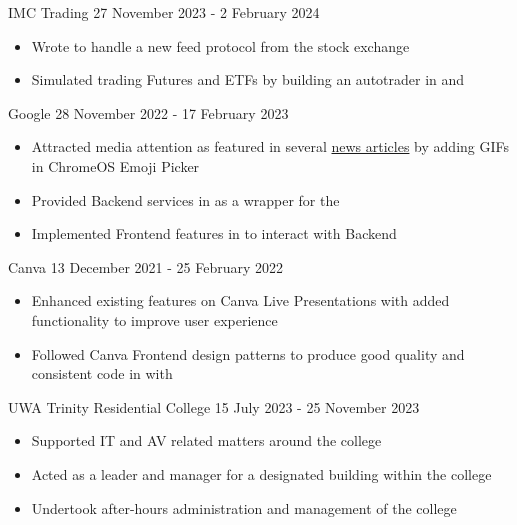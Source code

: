 \documentclass[paper=a4,fontsize=9pt]{resume}
\begin{document}
{	\divider

		{IMC Trading}
		{27 November 2023 - 2 February 2024}
	\begin{itemize}
		\item Wrote  to handle a new feed protocol from the stock exchange
		\item Simulated trading Futures and ETFs by building an autotrader in  and 
	\end{itemize}

	\divider

		{Google}
		{28 November 2022 - 17 February 2023}
	\begin{itemize}
		\item Attracted media attention as featured in several \href{https://chromeunboxed.com/gif-support-chromebook-chrome-os-emoji-picker/}{news articles} by adding GIFs in ChromeOS Emoji Picker
		\item Provided Backend services in  as a wrapper for the 
		\item Implemented Frontend features in  to interact with Backend
	\end{itemize}

	\divider

		{Canva}
		{13 December 2021 - 25 February 2022}
	\begin{itemize}
		\item Enhanced existing features on Canva Live Presentations with added functionality to improve user experience
		\item Followed Canva Frontend design patterns to produce good quality and consistent code in  with 
	\end{itemize}

	\divider

		{UWA Trinity Residential College}
		{15 July 2023 - 25 November 2023}
	\begin{itemize}
		\item Supported IT and AV related matters around the college
		\item Acted as a leader and manager for a designated building within the college
		\item Undertook after-hours administration and management of the college
	\end{itemize}

}
\end{document}
